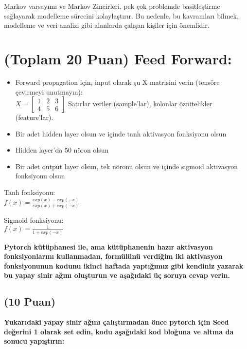\documentclass[11pt]{article}
\begin{document}
Markov varsayımı ve Markov Zincirleri, pek çok problemde basitleştirme sağlayarak modelleme sürecini kolaylaştırır. Bu nedenle, bu kavramları bilmek, modelleme ve veri analizi gibi alanlarda çalışan kişiler için önemlidir. 



\section{(Toplam 20 Puan) Feed Forward:}
 
\begin{itemize}
    \item Forward propagation için, input olarak şu X matrisini verin (tensöre çevirmeyi unutmayın):\\
    $X = \begin{bmatrix}
        1 & 2 & 3\\
        4 & 5 & 6
        \end{bmatrix}$
    Satırlar veriler (sample'lar), kolonlar öznitelikler (feature'lar).
    \item Bir adet hidden layer olsun ve içinde tanh aktivasyon fonksiyonu olsun
    \item Hidden layer'da 50 nöron olsun
    \item Bir adet output layer olsun, tek nöronu olsun ve içinde sigmoid aktivasyon fonksiyonu olsun
\end{itemize}

Tanh fonksiyonu:\\
$f(x) = \frac{exp(x) - exp(-x)}{exp(x) + exp(-x)}$
\vspace{.2in}

Sigmoid fonksiyonu:\\
$f(x) = \frac{1}{1 + exp(-x)}$

\vspace{.2in}
 \textbf{Pytorch kütüphanesi ile, ama kütüphanenin hazır aktivasyon fonksiyonlarını kullanmadan, formülünü verdiğim iki aktivasyon fonksiyonunun kodunu ikinci haftada yaptığımız gibi kendiniz yazarak bu yapay sinir ağını oluşturun ve aşağıdaki üç soruya cevap verin.}
 
\subsection{(10 Puan)} \textbf{Yukarıdaki yapay sinir ağını çalıştırmadan önce pytorch için Seed değerini 1 olarak set edin, kodu aşağıdaki kod bloğuna ve altına da sonucu yapıştırın:}
\end{document}
